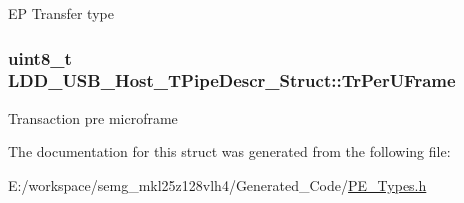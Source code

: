 E\-P Transfer type \hypertarget{struct_l_d_d___u_s_b___host___t_pipe_descr___struct_adb11454d0380a421cf7ab4fc225e5c41}{
\subsubsection[{Tr\-Per\-U\-Frame}]{\setlength{\rightskip}{0pt plus 5cm}uint8\-\_\-t L\-D\-D\-\_\-\-U\-S\-B\-\_\-\-Host\-\_\-\-T\-Pipe\-Descr\-\_\-\-Struct\-::\-Tr\-Per\-U\-Frame}}\label{struct_l_d_d___u_s_b___host___t_pipe_descr___struct_adb11454d0380a421cf7ab4fc225e5c41}
Transaction pre microframe 

The documentation for this struct was generated from the following file\-:\begin{DoxyCompactItemize}
\item 
E\-:/workspace/semg\-\_\-mkl25z128vlh4/\-Generated\-\_\-\-Code/\hyperlink{_p_e___types_8h}{P\-E\-\_\-\-Types.\-h}\end{DoxyCompactItemize}

